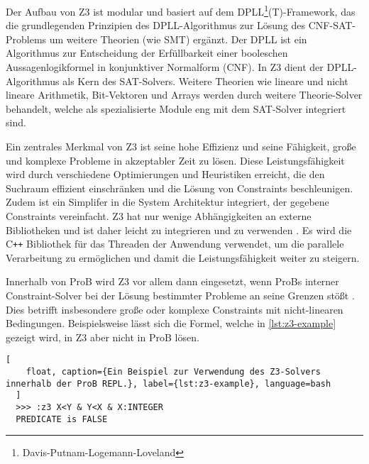 Der Aufbau von Z3 ist modular und basiert auf dem DPLL\footnote{Davis-Putnam-Logemann-Loveland}(T)-Framework,
das die grundlegenden Prinzipien des DPLL-Algorithmus zur Lösung des CNF-SAT-Problems um weitere Theorien (wie SMT) ergänzt.
Der DPLL ist ein Algorithmus zur Entscheidung der Erfüllbarkeit einer booleschen Aussagenlogikformel in konjunktiver Normalform (CNF).
In Z3 dient der DPLL-Algorithmus als Kern des SAT-Solvers.
Weitere Theorien wie lineare und nicht lineare Arithmetik, Bit-Vektoren und Arrays werden durch weitere Theorie-Solver behandelt,
welche als spezialisierte Module eng mit dem SAT-Solver integriert sind.

Ein zentrales Merkmal von Z3 ist seine hohe Effizienz und seine Fähigkeit,
große und komplexe Probleme in akzeptabler Zeit zu lösen.
Diese Leistungsfähigkeit wird durch verschiedene Optimierungen und Heuristiken erreicht,
die den Suchraum effizient einschränken und die Lösung von Constraints beschleunigen.
Zudem ist ein Simplifer in die System Architektur integriert, der gegebene Constraints vereinfacht.
Z3 hat nur wenige Abhängigkeiten an externe Bibliotheken und ist daher leicht zu integrieren und zu verwenden \cite{z3prover-github}.
Es wird die C\texttt{++} Bibliothek für das Threaden der Anwendung verwendet, um die parallele Verarbeitung zu ermöglichen und damit die Leistungsfähigkeit weiter zu steigern. 

Innerhalb von ProB wird Z3 vor allem dann eingesetzt, wenn ProBs interner Constraint-Solver bei der Lösung bestimmter Probleme an seine Grenzen stößt \cite{10.1007/978-3-319-33693-0_23}.
Dies betrifft insbesondere große oder komplexe Constraints mit nicht-linearen Bedingungen.
Beispielsweise lässt sich die Formel, welche in \cref{lst:z3-example} gezeigt wird, in Z3 aber nicht in ProB lösen.

\begin{lstlisting}[
    float, caption={Ein Beispiel zur Verwendung des Z3-Solvers innerhalb der ProB REPL.}, label={lst:z3-example}, language=bash
  ]
  >>> :z3 X<Y & Y<X & X:INTEGER
  PREDICATE is FALSE
\end{lstlisting}
\FloatBarrier



